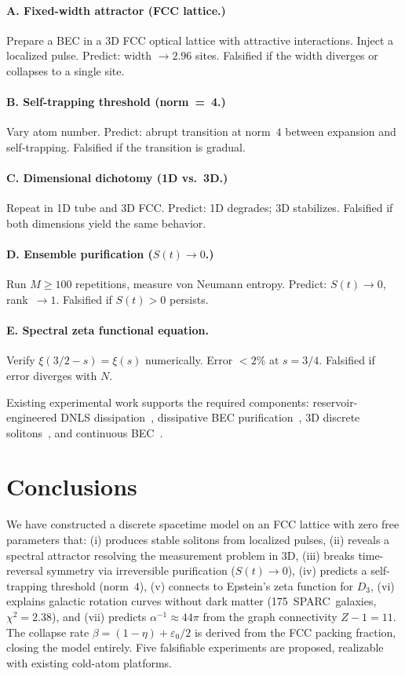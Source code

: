 \documentclass[twocolumn]{article}
\begin{document}
\paragraph{A. Fixed-width attractor (FCC lattice.)}
Prepare a BEC in a 3D FCC optical lattice with attractive interactions.
Inject a localized pulse. Predict: width $\to2.96$ sites.
Falsified if the width diverges or collapses to a single site.

\paragraph{B. Self-trapping threshold (norm~=~4.)}
Vary atom number. Predict: abrupt transition at norm~$4$ between
expansion and self-trapping. Falsified if the transition is gradual.

\paragraph{C. Dimensional dichotomy (1D vs.~3D.)}
Repeat in 1D tube and 3D FCC. Predict: 1D degrades; 3D stabilizes.
Falsified if both dimensions yield the same behavior.

\paragraph{D. Ensemble purification ($S(t)\to0$.)}
Run $M\ge100$ repetitions, measure von Neumann entropy.
Predict: $S(t)\to0$, rank~$\to1$. Falsified if $S(t)>0$ persists.

\paragraph{E. Spectral zeta functional equation.}
Verify $\xi(3/2-s)=\xi(s)$ numerically. Error $<2\%$ at $s=3/4$.
Falsified if error diverges with $N$.

Existing experimental work supports the required components:
reservoir-engineered DNLS dissipation~\cite{tissot2024},
dissipative BEC purification~\cite{westhoff2025}, 3D discrete
solitons~\cite{kevrekidis2004}, and continuous BEC~\cite{nature2022}.

\section{Conclusions}

We have constructed a discrete spacetime model on an FCC lattice with
zero free parameters that: (i) produces stable solitons from localized
pulses, (ii) reveals a spectral attractor resolving the measurement
problem in 3D, (iii) breaks time-reversal symmetry via irreversible
purification ($S(t)\to0$), (iv) predicts a self-trapping threshold
(norm~$4$), (v) connects to Epstein's zeta function for $D_3$,
(vi) explains galactic rotation curves without dark matter
(175~SPARC~galaxies,~$\chi^2=2.38$), and (vii) predicts
$\alpha^{-1}\approx44\pi$ from the graph connectivity $Z-1=11$.
The collapse rate $\beta=(1-\eta)+\varepsilon_0/2$ is derived from
the FCC packing fraction, closing the model entirely. Five falsifiable
experiments are proposed, realizable with existing cold-atom platforms.
\end{document}
